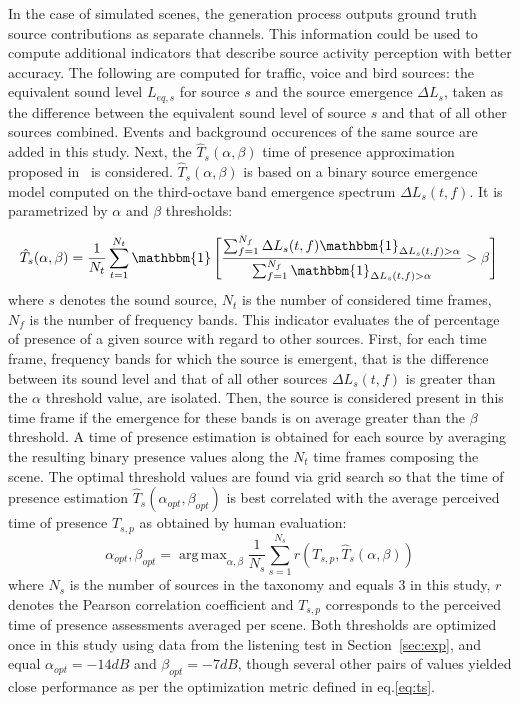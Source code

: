 \documentclass[twocolumn]{article}
\DeclareMathOperator*{\argmax}{arg\,max}
\begin{document}
In the case of simulated scenes, the generation process outputs ground truth source contributions as separate channels. This information could be used to compute additional indicators that describe source activity perception with better accuracy. The following are computed for traffic, voice and bird sources: the equivalent sound level $L_{eq, s}$ for source $s$ and the source emergence $\Delta L_{s}$, taken as the difference between the equivalent sound level of source $s$ and that of all other sources combined. Events and background occurences of the same source are added in this study. Next, the $\hat T_s(\alpha, \beta)$ time of presence approximation proposed in~\cite{gontier2018} is considered. $\hat T_s(\alpha, \beta)$ is based on a binary source emergence model computed on the third-octave band emergence spectrum $\Delta L_{s}(t, f)$. It is parametrized by $\alpha$ and $\beta$ thresholds:

\begin{equation}\label{eq:ts}
\hat T_s(\alpha, \beta) = \frac{1}{N_t}\sum_{t = 1}^{N_t}\mathbbm{1}\left[ \frac{\sum_{f = 1}^{N_f}\Delta L_{s}(t, f)\mathbbm{1}_{\Delta L_{s}(t, f)>\alpha}}{\sum_{f = 1}^{N_f}\mathbbm{1}_{\Delta L_{s}(t, f)>\alpha}}>\beta \right]\\
\end{equation}
where $s$ denotes the sound source, $N_t$ is the number of considered time frames, $N_f$ is the number of frequency bands. This indicator evaluates the of percentage of presence of a given source with regard to other sources. First, for each time frame, frequency bands for which the source is emergent, that is the difference between its sound level and that of all other sources $\Delta L_{s}(t, f)$ is greater than the $\alpha$ threshold value, are isolated. Then, the source is considered present in this time frame if the emergence for these bands is on average greater than the $\beta$ threshold. A time of presence estimation is obtained for each source by averaging the resulting binary presence values along the $N_t$ time frames composing the scene. The optimal threshold values are found via grid search so that the time of presence estimation $\hat T_s(\alpha_{opt}, \beta_{opt})$ is best correlated with the average perceived time of presence $T_{s, p}$ as obtained by human evaluation:
\begin{equation}\label{eq:ts_opt}
\alpha_{opt},\beta_{opt} = \argmax_{\alpha, \beta}\frac{1}{N_s}\sum_{s = 1}^{N_s}r\left(T_{s, p}, \hat T_s(\alpha, \beta)\right)
\end{equation}
where $N_s$ is the number of sources in the taxonomy and equals 3 in this study, $r$ denotes the Pearson correlation coefficient and $T_{s, p}$ corresponds to the perceived time of presence assessments averaged per scene. Both thresholds are optimized once in this study using data from the listening test in Section~\ref{sec:exp}, and equal $\alpha_{opt} = -14dB$ and $\beta_{opt} = -7dB$, though several other pairs of values yielded close performance as per the optimization metric defined in eq.\ref{eq:ts}.
\end{document}
